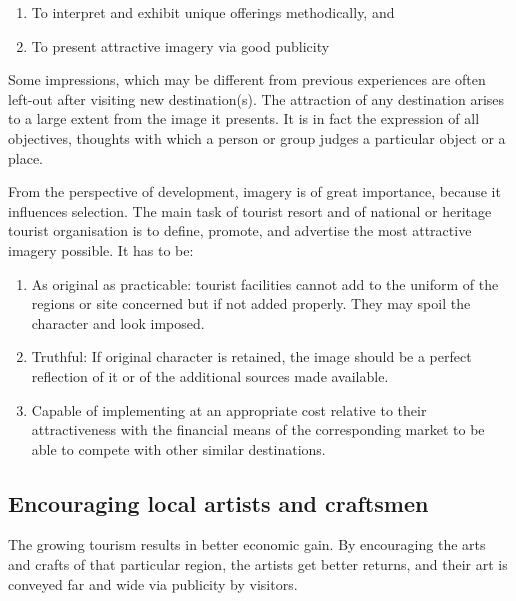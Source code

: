 \begin{enumerate}[noitemsep]
  \item To interpret and exhibit unique offerings methodically, and
  \item To present attractive imagery via good publicity
\end{enumerate}

\noindent Some impressions, which may be different from previous experiences are often left-out after visiting new destination(s). The attraction of any destination arises to a large extent from the image it presents. It is in fact the expression of all objectives, thoughts with which a person or group judges a particular object or a place.

From the perspective of development, imagery is of great importance, because it influences selection. The main task of tourist resort and of national or heritage tourist organisation is to define, promote, and advertise the most attractive imagery possible. It has to be:

\begin{enumerate}
  \item As original as practicable: tourist facilities cannot add to the uniform of the regions or site concerned but if not added properly. They may spoil the character and look imposed.
  \item Truthful: If original character is retained, the image should be a perfect reflection of it or of the additional sources made available.
  \item Capable of implementing at an appropriate cost relative to their attractiveness with the financial means of the corresponding market to be able to compete with other similar destinations.
\end{enumerate} 


\subsection{Encouraging local artists and craftsmen} %
\label{sub:encor}

The growing tourism results in better economic gain. By encouraging the arts and crafts of that particular region, the artists get better returns, and their art is conveyed far and wide via publicity by visitors.



